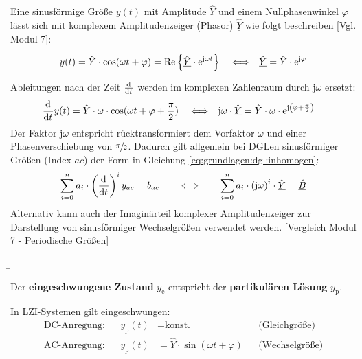 \begin{frame}
{    Eine sinusförmige Größe $y(t)$ mit Amplitude $\hat{Y}$ und einem Nullphasenwinkel $\varphi$ lässt sich mit komplexem Amplitudenzeiger (Phasor) $\underline{\hat{Y}}$ 
    wie folgt beschreiben [Vgl. Modul 7]:
    \begin{align*}
        y(t) &= \hat{Y} \cdot \cos(\omega t + \varphi) = \Re\left\{ \underline{\hat{Y}} \cdot \mathrm{e}^{\mathrm{j} \omega t} \right\} &
            &\Longleftrightarrow& 
            \underline{\hat{Y}} &= \hat{Y} \cdot \mathrm{e}^{\mathrm{j} \varphi} 
            \vphantom{\bigg|}\\
    \end{align*}
    Ableitungen nach der Zeit $\dt$ werden im komplexen Zahlenraum durch $\mathrm{j} \omega$ ersetzt:
    \begin{align*}
        \dt y(t) &= \hat{Y} \cdot \omega \cdot \cos(\omega t + \varphi + \frac{\pi}{2}) &
            &\Longleftrightarrow& 
            \mathrm{j} \omega \cdot  \underline{\hat{Y}} &= \hat{Y} \cdot \omega \cdot \mathrm{e}^{\mathrm{j} \left(\varphi + \frac{\pi}{2}\right)}
    \end{align*}
    Der Faktor $\mathrm{j}\omega$ entspricht rücktransformiert dem Vorfaktor $\omega$ und einer Phasenverschiebung von $\sfrac{\pi}{2}$. 
    Dadurch gilt allgemein bei DGLen sinusförmiger Größen (Index $ac$) der Form in Gleichung \ref{eq:grundlagen:dgl:inhomogen}: 
    \begin{equation}
        \sum_{i=0}^n a_i \cdot \left(\dt\right)^i y_{ac} = b_{ac}
        \qquad \Longleftrightarrow \qquad 
        \sum_{i=0}^n a_i \cdot \left(\mathrm{j}\omega\right)^i \cdot \underline{\hat{Y}} = \underline{\hat{B}}
        \label{eq:grundlagen:dgl:komplex}
    \end{equation}
    Alternativ kann auch der Imaginärteil komplexer Amplitudenzeiger zur Darstellung von sinusförmiger Wechselgrößen verwendet werden. 
    [Vergleich Modul 7 - Periodische Größen]

}%
\b{%
    Der \textbf{eingeschwungene Zustand} $y_{\mathrm{e}}$ entspricht der \textbf{partikulären Lösung} $y_{\mathrm{p}}$.
    \vspace{2mm}

    In LZI-Systemen gilt eingeschwungen:
    \begin{align*}
        \text{DC-Anregung:} && y_{\mathrm{p}}(t) &= \text{konst.} &&\text{(Gleichgröße)}\\
        \text{AC-Anregung:} && y_{\mathrm{p}}(t) &= \hat{Y} \cdot \sin(\omega t + \varphi) &&\text{(Wechselgröße)}
    \end{align*}

}
\end{frame}
